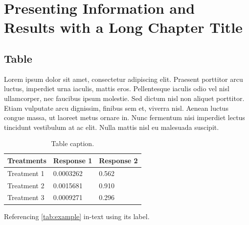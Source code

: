\documentclass[
	11pt, %
	fleqn, %
	a4paper, %
]{LegrandOrangeBook}
\begin{document}
\chapter{Presenting Information and Results with a Long Chapter Title}

\section{Table}

Lorem ipsum dolor sit amet, consectetur adipiscing elit. Praesent porttitor arcu luctus, imperdiet urna iaculis, mattis eros. Pellentesque iaculis odio vel nisl ullamcorper, nec faucibus ipsum molestie. Sed dictum nisl non aliquet porttitor. Etiam vulputate arcu dignissim, finibus sem et, viverra nisl. Aenean luctus congue massa, ut laoreet metus ornare in. Nunc fermentum nisi imperdiet lectus tincidunt vestibulum at ac elit. Nulla mattis nisl eu malesuada suscipit.

\begin{table}[H] %
	\centering %
	\begin{tabular}{L{0.15\textwidth} R{0.15\textwidth} R{0.15\textwidth}} %
		\toprule
		\textbf{Treatments} & \textbf{Response 1} & \textbf{Response 2} \\
		\midrule
		Treatment 1         & 0.0003262           & 0.562               \\
		Treatment 2         & 0.0015681           & 0.910               \\
		Treatment 3         & 0.0009271           & 0.296               \\
		\bottomrule
	\end{tabular}
	\caption{Table caption.}
	\label{tab:example} %
\end{table}

Referencing \autoref{tab:example} in-text using its label.
\end{document}
